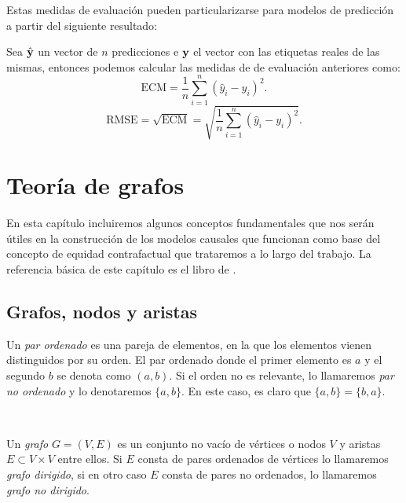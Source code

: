 \documentclass[oneside,openright,titlepage,numbers=noenddot,openany,headinclude,footinclude=true,
cleardoublepage=empty,abstractoff,BCOR=5mm,paper=a4,fontsize=12pt,main=spanish]{scrreprt}
\begin{document}
Estas medidas de evaluación pueden particularizarse para modelos de predicción a partir del siguiente resultado:\\

\begin{proposition}
Sea $\hat{\textbf{y}}$ un vector de $n$ predicciones e $\textbf{y}$ el vector con las etiquetas reales de las mismas, entonces podemos calcular las medidas de de evaluación anteriores como: $$\text{ECM}=\frac{1}{n}\sum_{i=1}^n (\hat{y}_i-y_i)^2.$$ $$\text{RMSE}=\sqrt{\text{ECM}}=\sqrt{\frac{1}{n}\sum_{i=1}^n (\hat{y}_i-y_i)^2}.$$
\end{proposition}

\chapter{Teoría de grafos} \label{ch:teorgraf}

En esta capítulo incluiremos algunos conceptos fundamentales que nos serán útiles en la construcción de los modelos causales que funcionan como base del concepto de equidad contrafactual que trataremos a lo largo del trabajo. La referencia básica de este capítulo es el libro de \cite{graphtheory2001}.

\section{Grafos, nodos y aristas}

\begin{definition}
Un \textit{par ordenado} es una pareja de elementos, en la que los elementos vienen distinguidos por su orden. El par ordenado donde el primer elemento es $a$ y el segundo $b$ se denota como $(a,b)$. Si el orden no es relevante, lo llamaremos \textit{par no ordenado} y lo denotaremos $\{a,b\}$. En este caso, es claro que $\{a,b\}=\{b,a\}$.
\end{definition}\

\begin{definition}[Grafo]
Un \textit{grafo} $G = (V,E)$ es un conjunto no vacío de vértices o nodos $V$ y aristas $E \subset V\times V$ entre ellos.
Si $E$ consta de pares ordenados de vértices lo llamaremos \textit{grafo dirigido}, si en otro caso $E$ consta de pares no ordenados, lo llamaremos \textit{grafo no dirigido}.
\end{definition}\
\end{document}
